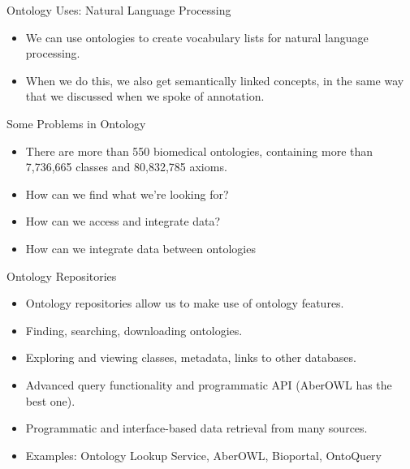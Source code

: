 \documentclass[aspectratio=169]{beamer} %
\begin{document}
\begin{frame}{Ontology Uses: Natural Language Processing}
  \begin{itemize}
    \item We can use ontologies to create vocabulary lists for natural language processing.
    \item When we do this, we also get semantically linked concepts, in the same way that we discussed when we spoke of annotation.
  \end{itemize}
\end{frame}

\begin{frame}{Some Problems in Ontology}
\begin{itemize}
  \item There are more than 550 biomedical ontologies, containing more than
  7,736,665 classes and 80,832,785 axioms.
  \item How can we find what we're looking for?
  \item How can we access and integrate data?
  \item How can we integrate data between ontologies
\end{itemize}
\end{frame}

\begin{frame}{Ontology Repositories}
\begin{itemize}
  \item Ontology repositories allow us to make use of ontology features.
  \item Finding, searching, downloading ontologies. 
  \item Exploring and viewing classes, metadata, links to other databases.
  \item Advanced query functionality and programmatic API (AberOWL has the best one).
  \item Programmatic and interface-based data retrieval from many sources.
  \item Examples: Ontology Lookup Service, AberOWL, Bioportal, OntoQuery
\end{itemize}
\end{frame}
\end{document}
